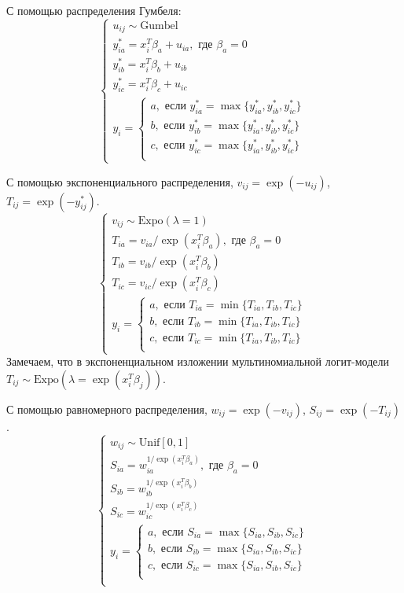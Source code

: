 \documentclass[12pt]{article}
\newcommand{\dUnif}{\mathrm{Unif}}
\newcommand{\dExpo}{\mathrm{Expo}} %
\newcommand{\dGumbel}{\mathrm{Gumbel}}
\begin{document}
С помощью распределения Гумбеля:
\[
\begin{cases}
u_{ij} \sim \dGumbel \\
y_{ia}^* = x_i^T \beta_a + u_{ia}, \text{ где } \beta_a = 0 \\
y_{ib}^* = x_i^T \beta_b + u_{ib} \\
y_{ic}^* = x_i^T \beta_c + u_{ic} \\
y_i = \begin{cases}
a, \text{ если } y_{ia}^* = \max\{y_{ia}^*, y_{ib}^*, y_{ic}^*\} \\
b, \text{ если } y_{ib}^* = \max\{y_{ia}^*, y_{ib}^*, y_{ic}^*\} \\
c, \text{ если } y_{ic}^* = \max\{y_{ia}^*, y_{ib}^*, y_{ic}^*\} \\
\end{cases}
\end{cases}
\]


С помощью экспоненциального распределения, $v_{ij} = \exp(-u_{ij})$, $T_{ij} = \exp(-y_{ij}^*)$.
\[
\begin{cases}
v_{ij} \sim \dExpo(\lambda=1) \\
T_{ia} = v_{ia} / \exp(x_i^T \beta_a), \text{ где } \beta_a = 0 \\
T_{ib} = v_{ib} / \exp(x_i^T \beta_b)\\
T_{ic} = v_{ic} / \exp(x_i^T \beta_c)\\
y_i = \begin{cases}
a, \text{ если } T_{ia} = \min\{T_{ia}, T_{ib}, T_{ic}\} \\
b, \text{ если } T_{ib} = \min\{T_{ia}, T_{ib}, T_{ic}\} \\
c, \text{ если } T_{ic} = \min\{T_{ia}, T_{ib}, T_{ic}\} \\
\end{cases}
\end{cases}
\]
Замечаем, что в экспоненциальном изложении мультиномиальной логит-модели $T_{ij} \sim \dExpo(\lambda = \exp(x_i^T \beta_j))$.


С помощью равномерного распределения, $w_{ij} = \exp(-v_{ij})$, $S_{ij} = \exp(-T_{ij})$.
\[
\begin{cases}
w_{ij} \sim \dUnif[0, 1] \\
S_{ia} = w_{ia}^{1/\exp(x_i^T \beta_a)}, \text{ где } \beta_a = 0 \\
S_{ib} = w_{ib}^{1/\exp(x_i^T \beta_b)} \\
S_{ic} = w_{ic}^{1/\exp(x_i^T \beta_c)} \\
y_i = \begin{cases}
a, \text{ если } S_{ia} = \max\{S_{ia}, S_{ib}, S_{ic}\} \\
b, \text{ если } S_{ib} = \max\{S_{ia}, S_{ib}, S_{ic}\} \\
c, \text{ если } S_{ic} = \max\{S_{ia}, S_{ib}, S_{ic}\} \\
\end{cases} \\
\end{cases}
\]
\end{document}
